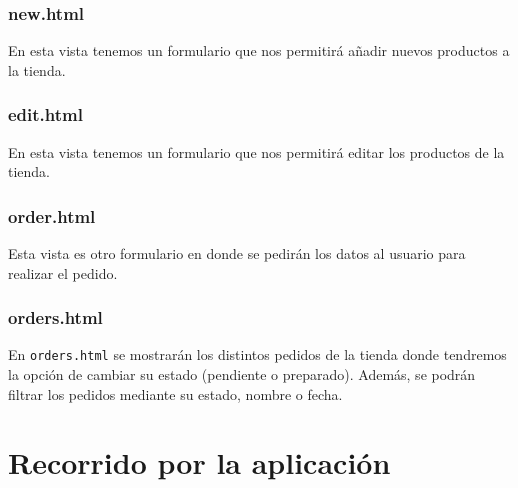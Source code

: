 \documentclass[12pt,a4paper,svgnames]{article}
\begin{document}
\subsubsection{new.html}
En esta vista tenemos un formulario que nos permitirá añadir nuevos productos a la tienda.
\subsubsection{edit.html}
En esta vista tenemos un formulario que nos permitirá editar los productos de la tienda.
\subsubsection{order.html}
Esta vista es otro formulario en donde se pedirán los datos al usuario para realizar el pedido.
\subsubsection{orders.html}
En \texttt{orders.html} se mostrarán los distintos pedidos de la tienda donde tendremos la opción de cambiar su estado (pendiente o preparado). Además, se podrán filtrar los pedidos mediante su estado, nombre o fecha.

\clearpage

\section{Recorrido por la aplicación}
\end{document}
